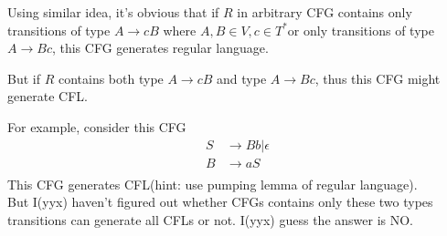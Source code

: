 \documentclass{article}
\begin{document}
\begin{itemize}
            Using similar idea, it's obvious that if $R$ in arbitrary CFG contains only transitions of type $A \rightarrow cB$ where $A, B \in V, c \in T^{*}$or only transitions of type $A \rightarrow Bc$, this CFG generates regular language.

            But if $R$ contains both type $A \rightarrow cB$ and type $A \rightarrow Bc$, thus this CFG might generate CFL.
            
            For example, consider this CFG
            \begin{align*}
                S & \rightarrow Bb | \epsilon \\
                B & \rightarrow aS\\
            \end{align*}
            This CFG generates CFL(hint: use pumping lemma of regular language). \\
            But I(yyx) haven't figured out whether CFGs contains only these two types transitions can generate all CFLs or not. I(yyx) guess the answer is NO.
    \end{itemize}

   
    
    
    
    

    
\end{document}
